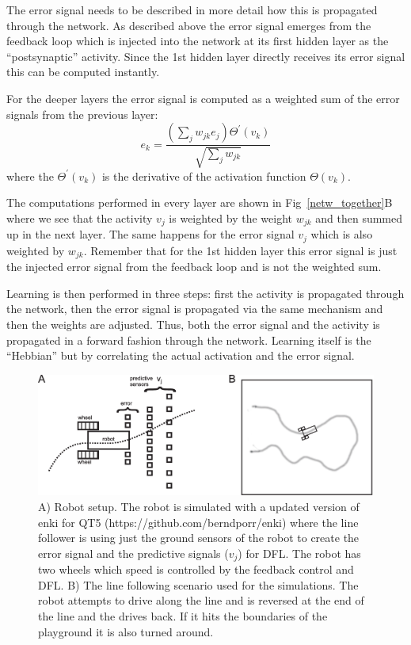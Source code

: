 \documentclass{llncs}
\begin{document}
The error signal needs to be described in more detail how this
is propagated through the network. As described above the error
signal emerges from the feedback loop which is injected into the
network at its first hidden layer as the ``postsynaptic'' activity.
Since the 1st hidden layer directly receives its error signal this
can be computed instantly.

For the deeper layers the error signal is computed as a weighted
sum of the error signals from the previous layer:
\begin{equation}
  e_k = \frac{\left( \sum_j w_{jk} e_{j} \right) \Theta^\prime (v_k) }{\sqrt{\sum_j w_{jk}}}
\end{equation}
where the $\Theta^\prime (v_k)$ is the derivative of the activation
function $\Theta(v_k)$.

The computations performed in every layer are shown in
Fig~\ref{netw_together}B where we see that the activity $v_j$ is
weighted by the weight $w_{jk}$ and then summed up in the next
layer. The same happens for the error signal $v_j$ which is also
weighted by $w_{jk}$. Remember that for the 1st hidden layer this
error signal is just the injected error signal from the feedback loop
and is not the weighted sum.

Learning is then performed in three steps: first the activity is propagated through
the network, then the error signal is propagated via the same mechanism and then the
weights are adjusted. Thus, both the error
signal and the activity is propagated in a forward fashion through the network.
Learning itself is the ``Hebbian'' but by correlating the actual activation
and the error signal. 

\begin{figure}[h!]
  \centering
  \includegraphics[width=\columnwidth]{linefollower_robot_playground}
  \caption{A) Robot setup. The robot is simulated with a updated
    version of enki for QT5 (https://github.com/berndporr/enki)
    where the line follower is using just the ground sensors of the
    robot to create the error signal and the predictive signals ($v_j$)
    for DFL. The robot has two wheels which speed is controlled
    by the feedback control and DFL.
    B) The line following scenario used for the simulations. The robot
    attempts to drive along the line and is reversed at the end of the
    line and the drives back. If it hits the boundaries of the playground
    it is also turned around.
    \label{linefollower_robot_playground}}
\end{figure}
\end{document}
